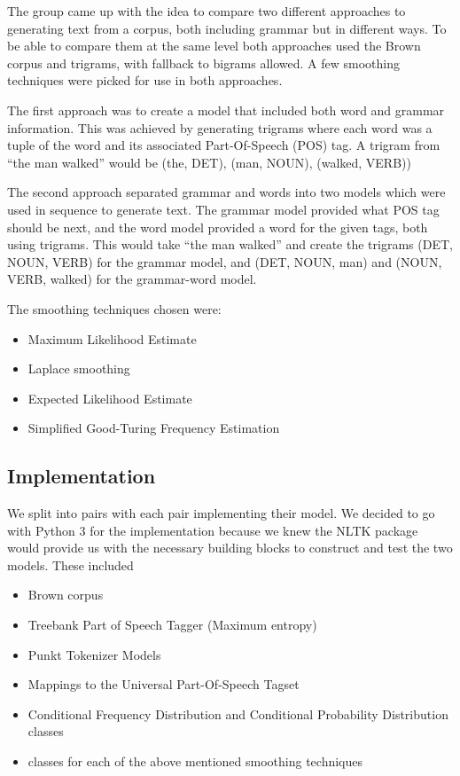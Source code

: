 \documentclass[a4paper,12pt]{article}
\begin{document}
The group came up with the idea to compare two different approaches to generating text from a corpus, both including grammar but in different ways. To be able to compare them at the same level both approaches used the Brown corpus and trigrams, with fallback to bigrams allowed. A few smoothing techniques were picked for use in both approaches.

The first approach was to create a model that included both word and grammar information. This was achieved by generating trigrams where each word was a tuple of the word and its associated Part-Of-Speech (POS) tag. A trigram from ``the man walked'' would be (the, DET), (man, NOUN), (walked, VERB)) 

The second approach separated grammar and words into two models which were used in sequence to generate text. The grammar model provided what POS tag should be next, and the word model provided a word for the given tags, both using trigrams. This would take ``the man walked'' and create the trigrams (DET, NOUN, VERB) for the grammar model, and (DET, NOUN, man) and (NOUN, VERB, walked) for the grammar-word model.

The smoothing techniques chosen were:
\begin{itemize}
\item Maximum Likelihood Estimate
\item Laplace smoothing
\item Expected Likelihood Estimate
\item Simplified Good-Turing Frequency Estimation
\end{itemize}

\subsection{Implementation}
\label{sec:impl}

We split into pairs with each pair implementing their model. We decided to go with Python 3 for the implementation because we knew the NLTK package would provide us with the necessary building blocks to construct and test the two models. These included 
\begin{itemize}
\item Brown corpus
\item Treebank Part of Speech Tagger (Maximum entropy)
\item Punkt Tokenizer Models
\item Mappings to the Universal Part-Of-Speech Tagset
\item Conditional Frequency Distribution and Conditional Probability Distribution classes
\item classes for each of the above mentioned smoothing techniques
\end{itemize}
\end{document}

